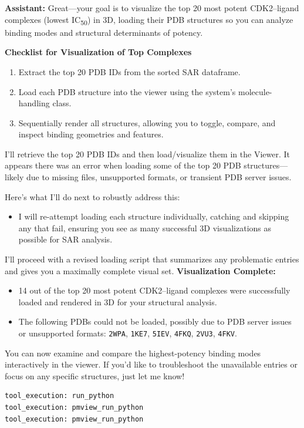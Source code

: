 \documentclass{article}
\begin{document}
\begin{assistantbox}
\textbf{Assistant:} Great—your goal is to visualize the top 20 most potent CDK2–ligand complexes (lowest IC\textsubscript{50}) in 3D, loading their PDB structures so you can analyze binding modes and structural determinants of potency.

\textbf{Checklist for Visualization of Top Complexes}
\begin{enumerate}[label=\arabic*.]
    \item Extract the top 20 PDB IDs from the sorted SAR dataframe.
    \item Load each PDB structure into the viewer using the system's molecule-handling class.
    \item Sequentially render all structures, allowing you to toggle, compare, and inspect binding geometries and features.
\end{enumerate}

I’ll retrieve the top 20 PDB IDs and then load/visualize them in the Viewer. It appears there was an error when loading some of the top 20 PDB structures—likely due to missing files, unsupported formats, or transient PDB server issues.

Here's what I'll do next to robustly address this:
\begin{itemize}
    \item I will re-attempt loading each structure individually, catching and skipping any that fail, ensuring you see as many successful 3D visualizations as possible for SAR analysis.
\end{itemize}

I’ll proceed with a revised loading script that summarizes any problematic entries and gives you a maximally complete visual set.
\textbf{Visualization Complete:}
\begin{itemize}
    \item 14 out of the top 20 most potent CDK2–ligand complexes were successfully loaded and rendered in 3D for your structural analysis.
    \item The following PDBs could not be loaded, possibly due to PDB server issues or unsupported formats: \texttt{2WPA}, \texttt{1KE7}, \texttt{5IEV}, \texttt{4FKQ}, \texttt{2VU3}, \texttt{4FKV}.
\end{itemize}

You can now examine and compare the highest-potency binding modes interactively in the viewer. If you'd like to troubleshoot the unavailable entries or focus on any specific structures, just let me know!
\begin{verbatim}
tool_execution: run_python
tool_execution: pmview_run_python
tool_execution: pmview_run_python
\end{verbatim}
\end{assistantbox}
\end{document}
